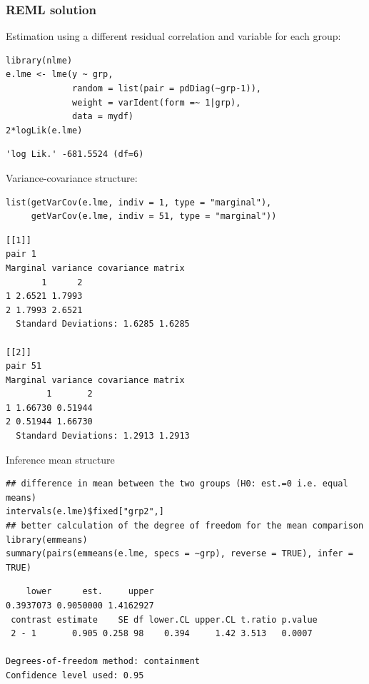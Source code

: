 \documentclass{article}
\begin{document}
\subsubsection{REML solution}
\label{sec:org88f337a}
Estimation using a different residual correlation and variable for each group:
\lstset{language=r,label= ,caption= ,captionpos=b,numbers=none}
\begin{lstlisting}
library(nlme)
e.lme <- lme(y ~ grp,
             random = list(pair = pdDiag(~grp-1)),
             weight = varIdent(form =~ 1|grp),
             data = mydf)
2*logLik(e.lme)
\end{lstlisting}

\begin{verbatim}
'log Lik.' -681.5524 (df=6)
\end{verbatim}


\clearpage

Variance-covariance structure:
\lstset{language=r,label= ,caption= ,captionpos=b,numbers=none}
\begin{lstlisting}
list(getVarCov(e.lme, indiv = 1, type = "marginal"),
     getVarCov(e.lme, indiv = 51, type = "marginal"))
\end{lstlisting}

\begin{verbatim}
[[1]]
pair 1 
Marginal variance covariance matrix
       1      2
1 2.6521 1.7993
2 1.7993 2.6521
  Standard Deviations: 1.6285 1.6285 

[[2]]
pair 51 
Marginal variance covariance matrix
        1       2
1 1.66730 0.51944
2 0.51944 1.66730
  Standard Deviations: 1.2913 1.2913
\end{verbatim}

Inference mean structure
\lstset{language=r,label= ,caption= ,captionpos=b,numbers=none}
\begin{lstlisting}
## difference in mean between the two groups (H0: est.=0 i.e. equal means)
intervals(e.lme)$fixed["grp2",]
## better calculation of the degree of freedom for the mean comparison
library(emmeans)
summary(pairs(emmeans(e.lme, specs = ~grp), reverse = TRUE), infer = TRUE)
\end{lstlisting}

\begin{verbatim}
    lower      est.     upper 
0.3937073 0.9050000 1.4162927
 contrast estimate    SE df lower.CL upper.CL t.ratio p.value
 2 - 1       0.905 0.258 98    0.394     1.42 3.513   0.0007 

Degrees-of-freedom method: containment 
Confidence level used: 0.95
\end{verbatim}
\end{document}
